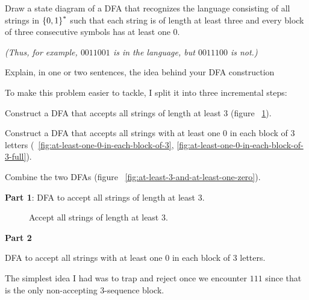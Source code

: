 \begin{problem}
Draw a state diagram of a DFA that recognizes the language consisting of all strings
in $\left\{0, 1\right\}^*$ such that each string is of length at least three
and every block of three consecutive symbols has at least one $0$.

\noindent
\emph{(Thus, for example, $0011001$ is in the language, but $0011100$ is not.)}

\step
Explain, in one or two sentences, the idea behind your DFA construction
\end{problem}

\begin{Answer}
  To make this problem easier to tackle,
  I split it into three incremental steps:
  \begin{enumroman}
    \item Construct a DFA that accepts all strings of length at least $3$ (figure ~\ref{fig:at-least-3}).
    \item Construct a DFA that accepts all strings with at least one $0$ in each block of $3$ letters (~\ref{fig:at-least-one-0-in-each-block-of-3}, \ref{fig:at-least-one-0-in-each-block-of-3-full}).
    \item Combine the two DFAs (figure ~\ref{fig:at-least-3-and-at-least-one-zero}).
  \end{enumroman}

  \step
  \textbf{Part 1}: DFA to accept all strings of length at least $3$.

  \begin{figure}[H]
    \centering
    \caption{Accept all strings of length at least $3$.}
    \label{fig:at-least-3}
  \end{figure}

  \step
  \textbf{Part 2}

  \step DFA to accept all strings with at least one $0$ in each block of $3$ letters.

  \step
  The simplest idea I had was to trap and reject once we encounter
   $111$ since that is the only non-accepting $3$-sequence block.


\end{Answer}
